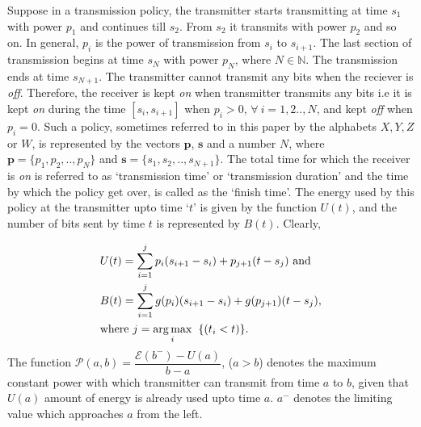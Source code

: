 Suppose in a transmission policy, the transmitter starts transmitting at time $s_1$ with power $p_1$ and continues till $s_2$. From $s_2$ it transmits with power $p_2$ and so on. In general, $p_i$ is the power of transmission from $s_i$ to $s_{i+1}$. The last section of transmission begins at time $s_N$ with power $p_N$, where $N\in \mathbb{N}$. The transmission ends at time $s_{N+1}$. The transmitter cannot transmit any bits when the reciever is \textit{off}. Therefore, the receiver is kept \textit{on} when transmitter transmits any bits i.e it is kept \textit{on} during the time $[s_i,s_{i+1}]$ when $p_i > 0$, $\forall \ i=1,2..,N$, and kept \textit{off} when $p_i=0$. Such a policy, sometimes referred to in this paper by the alphabets $X,Y,Z$ or $W$, is represented by the vectors $\bm{p}$, $\bm{s}$ and a number $N$, where $\bm{p}=\{p_1, p_2, .., p_N\}$ and $\bm{s}=\{s_1, s_2, .., s_{N+1}\}$. The total time for which the receiver is \textit{on} is referred to as `transmission time' or `transmission duration' and the time by which the policy get over, is called as the `finish time'. The energy used by this policy at the transmitter upto time `$t$' is given by the function $U(t)$, and the number of bits sent by time $t$ is represented by $B(t)$. Clearly,

\begin{align}
&U(t)=\sum_{i=1}^{j} p_i(s_{i+1}-s_i)+p_{j+1}(t-s_j) \text{ and }
\\
&B(t)=\sum_{i=1}^{j} g(p_i)(s_{i+1}-s_i)+g(p_{j+1})(t-s_j),
\\
&\text{where }j=\operatorname*{arg\,max}_{i} \hspace{2mm}\{(t_i<t)\}.\nonumber
\end{align}
The function $\mathcal{P}(a,b)=\dfrac{\mathcal{E}(b^- )-U(a)}{b-a}$,  ($a>b$) denotes the maximum constant power with which transmitter can transmit from time $a$ to $b$, given that $U(a)$ amount of energy is already used upto time $a$. $a^-$ denotes the limiting value which approaches $a$ from the left.

